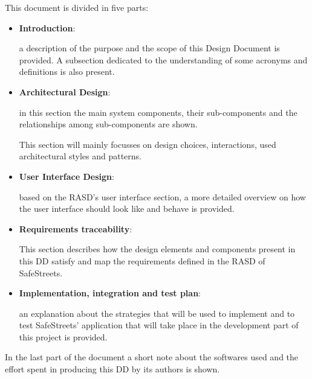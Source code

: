 This document is divided in five parts:

\begin{itemize}
	
	\item \textbf{Introduction}: 
	
	a description of the purpose and the scope of this Design Document is provided. A subsection dedicated to the understanding of some acronyms and definitions is also present. 
	
	\item \textbf{Architectural Design}:
	
	in this section the main system components, their sub-components and the relationships among sub-components are shown.
	
	This section will mainly focusses on design choices, interactions, used architectural styles and patterns.
	
	\item \textbf{User Interface Design}: 
	
	based on the RASD's user interface section, a more detailed overview on how the user interface should look like and behave is provided. 
	
	\item \textbf{Requirements traceability}: 
	
	This section describes how the design elements and components present in this DD satisfy and map the requirements defined in the RASD of SafeStreets.
	
	\item \textbf{Implementation, integration and test plan}: 
	
	an explanation about the strategies that will be used to implement and to test SafeStreets' application that will take place in the development part of this project is provided.
	
\end{itemize}

In the last part of the document a short note about the softwares used and the effort spent in producing this DD by its authors is shown.